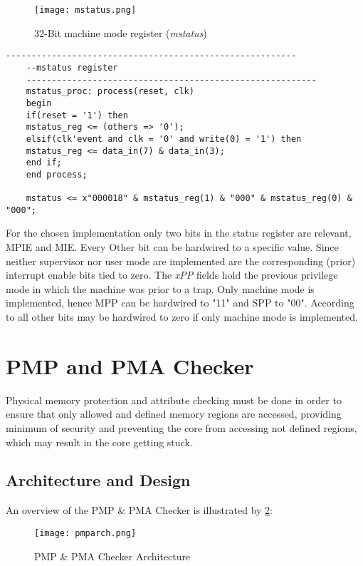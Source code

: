 \begin{figure}[H]
	\centering
	\texttt{[image: mstatus.png]}
	\caption{32-Bit machine mode register (\textit{mstatus}) \cite{riscv:privileged}}
	\label{fig:mstatus}
\end{figure}

\begin{lstlisting}[style=vhdl, caption=mstatus implementation]
	---------------------------------------------------------
	--mstatus register
	---------------------------------------------------------
	mstatus_proc: process(reset, clk)
	begin
	if(reset = '1') then
	mstatus_reg <= (others => '0');
	elsif(clk'event and clk = '0' and write(0) = '1') then
	mstatus_reg <= data_in(7) & data_in(3);
	end if;
	end process;
	
	mstatus <= x"000018" & mstatus_reg(1) & "000" & mstatus_reg(0) & "000";
\end{lstlisting}

For the chosen implementation only two bits in the status register are relevant, \ac{MPIE} and \ac{MIE}. Every Other bit can be hardwired to a specific value. Since neither supervisor nor user mode are implemented are the corresponding (prior) interrupt enable bits tied to zero. The \textit{xPP} fields hold the previous privilege mode in which the machine was prior to a trap. Only machine mode is implemented, hence \ac{MPP} can be hardwired to "11" and \ac{SPP} to "00". According to \cite{riscv:privileged} all other bits may be hardwired to zero if only machine mode is implemented. \\

\section{PMP and PMA Checker}
Physical memory protection and attribute checking must be done in
order to ensure that only allowed and defined memory regions are accessed, providing
minimum of security and preventing the core from accessing not defined regions, which
may result in the core getting stuck.\\


\subsection{Architecture and Design}
An overview of the \ac{PMP} \& \ac{PMA} Checker is illustrated by \ref{fig:pmparch}:

\begin{figure}[H]
	\centering
	\texttt{[image: pmparch.png]}
	\caption{PMP \& PMA Checker Architecture}
	\label{fig:pmparch}
\end{figure}


